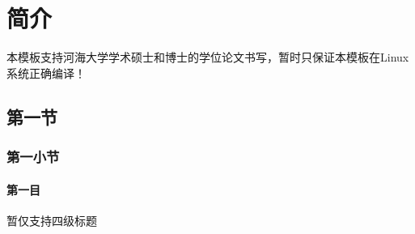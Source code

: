 \chapter{简介}
本模板支持河海大学学术硕士和博士的学位论文书写，暂时只保证本模板在Linux系统正确编译！

\section{第一节}
\subsection{第一小节}
\subsubsection{第一目}
暂仅支持四级标题